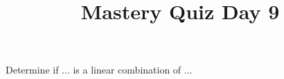\documentclass{sbgquiz}
\title{Mastery Quiz Day 9 }
\begin{document}
\begin{problem}[V2]
Determine if ... is a linear combination of ...
\end{problem}
\end{document}
